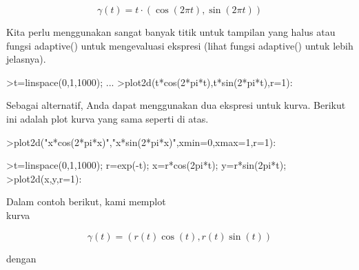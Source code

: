 \documentclass[12pt,Times new roman,letterpaper]{book}
\begin{document}
\begin{eulernootebook}
\begin{eulercomment}
\begin{eulercomment}
\begin{eulernootebook}
\begin{eulercomment}
\begin{eulercomment}
\begin{eulercomment}
\begin{eulercomment}
\begin{eulercomment}
\begin{eulercomment}
\begin{eulercomment}
\begin{eulernotebook}
\begin{eulercomment}
\begin{eulercomment}
\begin{eulercomment}
\begin{eulercomment}
\begin{eulercomment}
\end{eulercomment}
\begin{eulerformula}
\[
\gamma(t) = t \cdot (\cos(2\pi t),\sin(2\pi t))
\]
\end{eulerformula}
\begin{eulercomment}
Kita perlu menggunakan sangat banyak titik untuk tampilan yang halus
atau fungsi adaptive() untuk mengevaluasi ekspresi (lihat fungsi
adaptive() untuk lebih jelasnya).
\end{eulercomment}
\begin{eulerprompt}
>t=linspace(0,1,1000); ...
>plot2d(t*cos(2*pi*t),t*sin(2*pi*t),r=1):
\end{eulerprompt}
\begin{eulercomment}
Sebagai alternatif, Anda dapat menggunakan dua ekspresi untuk kurva.
Berikut ini adalah plot kurva yang sama seperti di atas.
\end{eulercomment}
\begin{eulerprompt}
>plot2d("x*cos(2*pi*x)","x*sin(2*pi*x)",xmin=0,xmax=1,r=1):
\end{eulerprompt}
\begin{eulerprompt}
>t=linspace(0,1,1000); r=exp(-t); x=r*cos(2pi*t); y=r*sin(2pi*t);
>plot2d(x,y,r=1):
\end{eulerprompt}
\begin{eulercomment}
Dalam contoh berikut, kami memplot\\
kurva

\end{eulercomment}
\begin{eulerformula}
\[
\gamma(t) = (r(t) \cos(t), r(t) \sin(t))
\]
\end{eulerformula}
\begin{eulercomment}
dengan


\end{eulercomment}
\end{eulercomment}
\end{eulercomment}
\end{eulercomment}
\end{eulercomment}
\end{eulernotebook}
\end{eulercomment}
\end{eulercomment}
\end{eulercomment}
\end{eulercomment}
\end{eulercomment}
\end{eulercomment}
\end{eulercomment}
\end{eulernootebook}
\end{eulercomment}
\end{eulercomment}
\end{eulernootebook}
\end{document}
